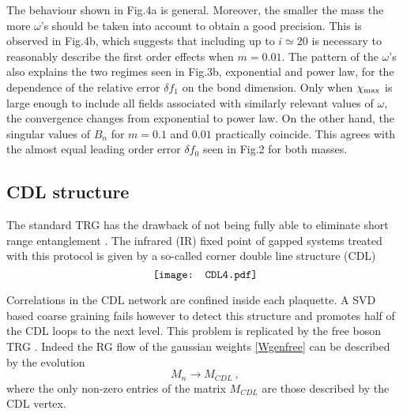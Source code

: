 \documentclass[a4paper,preprintnumbers,nofootinbib,twocolumn]{quantumarticle}
\newcommand{\be}{\begin{equation}} \newcommand{\ee}{\end{equation}}
\begin{document}
The behaviour shown in Fig.4a is general. Moreover, the smaller the mass the more $\omega$'s should be taken into account to obtain a good precision. This is observed in Fig.4b, which
suggests that including up to $i \simeq 20$ is necessary to reasonably describe the first order effects when $m=0.01$.
The pattern of the $\omega$'s also explains the two regimes seen in Fig.3b, exponential and power law, for the dependence of the relative
error $\delta f_1$ on the bond dimension. Only when $\chi_{\rm max}$ is large enough to include all fields associated with similarly relevant values of $\omega$, the convergence changes from exponential to power law.
On the other hand, the singular values of $B_n$ for $m=0.1$ and $0.01$ practically coincide. This agrees with the almost equal leading order error $\delta f_0$ seen in Fig.2 for both masses.

\subsection{CDL structure}

The standard TRG has the drawback of not being fully able to eliminate short range entanglement \cite{GW09}. The infrared (IR) fixed point of gapped systems treated with this protocol is given by a so-called corner double line structure (CDL)
\vspace*{-1.6cm}
\begin{equation}
\vcenter{\hbox{\texttt{[image: CDL4.pdf]}}} 
\label{CDL2}
\end{equation}

\vspace*{-1.6cm}
\noindent Correlations in the CDL network are confined inside each plaquette. A SVD based coarse graining fails however to detect this structure and promotes half of the CDL loops to the next level. 
This problem is replicated by the free boson TRG \cite{CS19}. Indeed the RG flow of the gaussian weights \eqref{Wgenfree} can be described by the evolution
\be
M_n \to M_{CDL} \ ,
\label{MCDL}
\ee
where the only non-zero entries of the matrix $M_{CDL}$ are those described by the CDL vertex.
\end{document}
